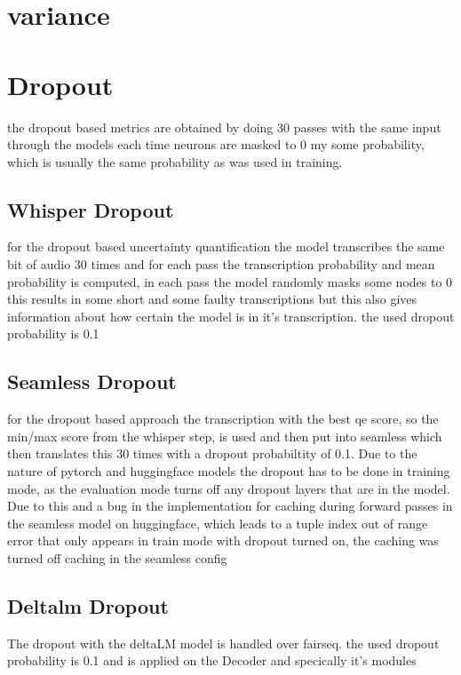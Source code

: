 \section{variance}


\section{Dropout}
the dropout based metrics are obtained by doing 30 passes with the same input through the models each time neurons are masked to 0 my some probability, which is usually the same probability as was used in training. 

\subsection{Whisper Dropout}
for the dropout based uncertainty quantification the model transcribes the same bit of audio 30 times and for each pass the transcription probability and mean probability is computed, in each pass the model randomly masks some nodes to 0
this results in some short and some faulty transcriptions but this also gives information about how certain the model is in it's transcription. the used dropout probability is 0.1 


\subsection{Seamless Dropout}
for the dropout based approach the transcription with the best qe score, so the min/max score from the whisper step, is used 
and then put into seamless which then translates this 30 times with a dropout probabiltity of 0.1.
Due to the nature of pytorch and huggingface models the dropout has to be done in training mode, as the evaluation mode turns off any dropout layers that are in the model. Due to this and a bug in the implementation for caching during forward passes in the seamless model on huggingface, which leads to a tuple index out of range error that only appears in train mode with dropout turned on, the caching was turned off caching in the seamless config

\subsection{Deltalm Dropout}
The dropout with the deltaLM model is handled over fairseq. 
the used dropout probability is 0.1 and is applied on the Decoder and specically it's modules



